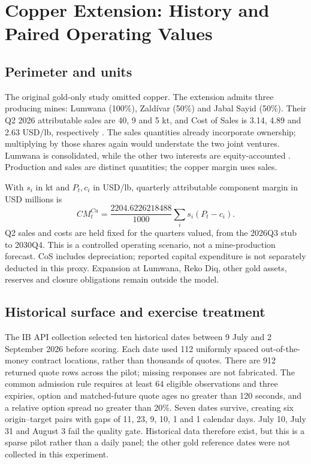 \section{Copper Extension: History and Paired Operating Values}
\label{sec:copper-extension}

\subsection{Perimeter and units}
The original gold-only study omitted copper. The extension admits three producing mines: Lumwana (100\%), Zald\'ivar (50\%) and Jabal Sayid (50\%). Their Q2 2026 attributable sales are 40, 9 and 5 kt, and Cost of Sales is 3.14, 4.89 and 2.63 USD/lb, respectively \citep{barrickmine2026}. The sales quantities already incorporate ownership; multiplying by those shares again would understate the two joint ventures. Lumwana is consolidated, while the other two interests are equity-accounted \citep{barrickar2025}. Production and sales are distinct quantities; the copper margin uses sales.

With $s_i$ in kt and $P_t,c_i$ in USD/lb, quarterly attributable component margin in USD millions is
\begin{equation}
CM^{Cu}_t=\frac{2204.6226218488}{1000}\sum_i s_i(P_t-c_i).
\label{eq:copper-margin}
\end{equation}
Q2 sales and costs are held fixed for the quarters valued, from the 2026Q3 stub to 2030Q4. This is a controlled operating scenario, not a mine-production forecast. CoS includes depreciation; reported capital expenditure is not separately deducted in this proxy. Expansion at Lumwana, Reko Diq, other gold assets, reserves and closure obligations remain outside the model.

\subsection{Historical surface and exercise treatment}
The IB API collection selected ten historical dates between 9 July and 2 September 2026 before scoring. Each date used 112 uniformly spaced out-of-the-money contract locations, rather than thousands of quotes. There are 912 returned quote rows across the pilot; missing responses are not fabricated. The common admission rule requires at least 64 eligible observations and three expiries, option and matched-future quote ages no greater than 120 seconds, and a relative option spread no greater than 20\%. Seven dates survive, creating six origin--target pairs with gaps of 11, 23, 9, 10, 1 and 1 calendar days. July 10, July 31 and August 3 fail the quality gate. Historical data therefore exist, but this is a sparse pilot rather than a daily panel; the other gold reference dates were not collected in this experiment.

